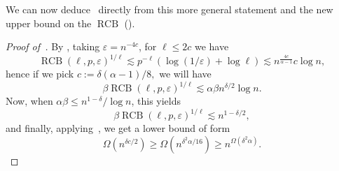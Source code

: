 \documentclass[10pt,a4paper]{article}
\newcommand{\RCB}{\mathop{RCB}}
\begin{document}
We can now deduce~ directly from this more general statement and the new upper bound on the $\RCB$ ().
\begin{proof}[Proof of~]
By , taking $\varepsilon = n^{-4c}$, for $\ell \leq 2c$ we have
\begin{equation*}
    \RCB(\ell, p, \varepsilon)^{1/\ell} \lesssim p^{-\ell} (\log (1/\varepsilon) + \log \ell) \lesssim n^{\frac{4 c}{\alpha - 1}} c \log n,
\end{equation*}
hence if we pick $c := \delta (\alpha-1)/8,$
we will have
\begin{equation*}
    \beta \RCB(\ell, p, \varepsilon)^{1/\ell} \lesssim \alpha \beta n^{\delta/2} \log n.
\end{equation*}
Now, when $\alpha \beta \leq n^{1-\delta} / \log n$, this yields
\begin{equation*}
    \beta \RCB(\ell, p, \varepsilon)^{1/\ell} \lesssim n^{1-\delta/2},
\end{equation*}
and finally, applying~, we get a lower bound of form
\begin{equation*}
    \Omega(n^{\delta c /2}) \geq \Omega(n^{\delta^2 \alpha / 16}) \geq n^{\Omega(\delta^2 \alpha)}.
\end{equation*}
    
\end{proof}

\iffalse
\end{document}
